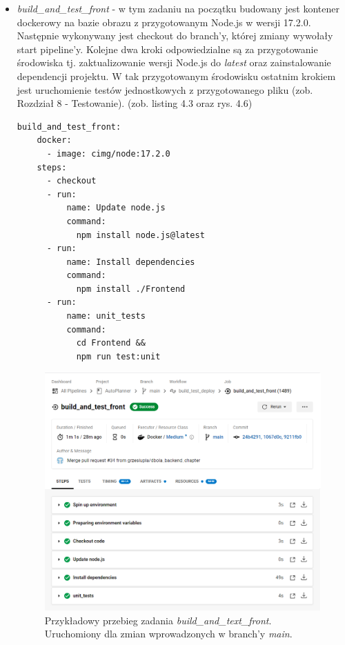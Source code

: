 \begin{itemize}
\newpage
	\item \textit{build\_and\_test\_front} - w tym zadaniu na początku budowany jest kontener dockerowy na bazie obrazu z przygotowanym Node.js w wersji 17.2.0. Następnie wykonywany jest checkout do branch'y, której zmiany wywołały start pipeline'y.  Kolejne dwa kroki odpowiedzialne są za przygotowanie środowiska tj. zaktualizowanie wersji Node.js do \textit{latest} oraz zainstalowanie dependencji projektu. W tak przygotowanym środowisku ostatnim krokiem jest uruchomienie testów jednostkowych z przygotowanego pliku (zob. Rozdział 8 - Testowanie). (zob. listing 4.3 oraz rys. 4.6)
\begin{lstlisting}[caption=Część skryptu config.yml odpowiadająca za wykonanie zadania \textit{build\_and\_test\_front}.]
build_and_test_front:
    docker:
      - image: cimg/node:17.2.0
    steps:
      - checkout
      - run:  
          name: Update node.js
          command:
            npm install node.js@latest
      - run:
          name: Install dependencies
          command:
            npm install ./Frontend
      - run:
          name: unit_tests
          command:
            cd Frontend &&
            npm run test:unit
\end{lstlisting}
\newpage
\begin{figure}[H]
\centering\includegraphics[width=\textwidth]{figures/circleci_test_front}
\caption{Przykładowy przebieg zadania \textit{build\_and\_text\_front}. Uruchomiony dla zmian wprowadzonych w branch'y \textit{main}.}
\end{figure}


\end{itemize}
